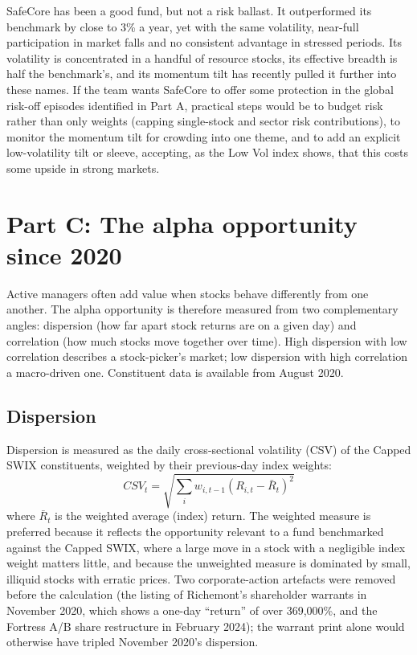 \documentclass[11pt,preprint]{elsarticle}
\numberwithin{equation}{section}
\numberwithin{figure}{section}
\numberwithin{table}{section}
\begin{document}
SafeCore has been a good fund, but not a risk ballast. It outperformed
its benchmark by close to 3\% a year, yet with the same volatility,
near-full participation in market falls and no consistent advantage in
stressed periods. Its volatility is concentrated in a handful of
resource stocks, its effective breadth is half the benchmark's, and its
momentum tilt has recently pulled it further into these names. If the
team wants SafeCore to offer some protection in the global risk-off
episodes identified in Part A, practical steps would be to budget risk
rather than only weights (capping single-stock and sector risk
contributions), to monitor the momentum tilt for crowding into one
theme, and to add an explicit low-volatility tilt or sleeve, accepting,
as the Low Vol index shows, that this costs some upside in strong
markets.

\section{\texorpdfstring{Part C: The alpha opportunity since 2020
\label{PartC}}{Part C: The alpha opportunity since 2020 }}\label{part-c-the-alpha-opportunity-since-2020}

Active managers often add value when stocks behave differently from one
another. The alpha opportunity is therefore measured from two
complementary angles: dispersion (how far apart stock returns are on a
given day) and correlation (how much stocks move together over time).
High dispersion with low correlation describes a stock-picker's market;
low dispersion with high correlation a macro-driven one. Constituent
data is available from August 2020.

\subsection{Dispersion}\label{dispersion}

Dispersion is measured as the daily cross-sectional volatility (CSV) of
the Capped SWIX constituents, weighted by their previous-day index
weights: \[CSV_t = \sqrt{\sum_i w_{i,t-1}(R_{i,t} - \bar{R}_t)^2}\]
where \(\bar{R}_t\) is the weighted average (index) return. The weighted
measure is preferred because it reflects the opportunity relevant to a
fund benchmarked against the Capped SWIX, where a large move in a stock
with a negligible index weight matters little, and because the
unweighted measure is dominated by small, illiquid stocks with erratic
prices. Two corporate-action artefacts were removed before the
calculation (the listing of Richemont's shareholder warrants in November
2020, which shows a one-day ``return'' of over 369,000\%, and the
Fortress A/B share restructure in February 2024); the warrant print
alone would otherwise have tripled November 2020's dispersion.
\end{document}
